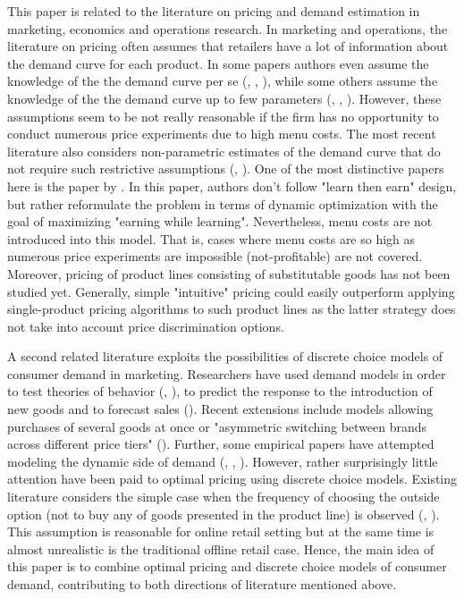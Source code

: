 \documentclass[12pt]{article}
\begin{document}
\par This paper is related to the literature on pricing and demand estimation in marketing, economics and operations research.
In marketing and operations, the literature on pricing often assumes that retailers have a lot of information about the demand curve for each product.
In some papers authors even assume the knowledge of the the demand curve per se (\cite{acquisti2005conditioning}, \cite{nair2007intertemporal}, \cite{akccay2010joint}), while some others assume the knowledge of the the demand curve up to few parameters (\cite{braden1994nonlinear}, \cite{bonatti2011menu}, \cite{biyalogorsky2014design}).
However, these assumptions seem to be not really reasonable if the firm has no opportunity to conduct numerous price experiments due to high menu costs.
The most recent literature also considers non-parametric estimates of the demand curve that do not require such restrictive assumptions (\cite{lei2014near}, \cite{misra2018dynamic}).
One of the most distinctive papers here is the paper by \cite{misra2018dynamic}.
In this paper, authors don't follow "learn then earn" design, but rather reformulate the problem in terms of dynamic optimization with the goal of maximizing "earning while learning".
Nevertheless, menu costs are not introduced into this model.
That is, cases where menu costs are so high as numerous price experiments are impossible (not-profitable) are not covered.
Moreover, pricing of product lines consisting of substitutable goods has not been studied yet.
Generally, simple "intuitive" pricing could easily outperform applying single-product pricing algorithms to such product lines as the latter strategy does not take into account price discrimination options.

\par A second related literature exploits the possibilities of discrete choice models of consumer demand in marketing. 
Researchers have used demand models in order to test theories of behavior (\cite{hendel2006measuring}, \cite{anderson2003effects}), to predict the response to the introduction of new goods and to forecast sales (\cite{chintagunta2011structural}).
Recent extensions include models allowing purchases of several goods at once or "asymmetric switching between brands across different price tiers" (\cite{chintagunta2011structural}).
Further, some empirical papers have attempted modeling the dynamic side of demand (\cite{erdem2005learning}, \cite{seiler2013impact}, \cite{hartmann2010retail}).
However, rather surprisingly little attention have been paid to optimal pricing using discrete choice models.
Existing literature considers the simple case when the frequency of choosing the outside option (not to buy any of goods presented in the product line) is observed (\cite{li2011pricing}, \cite{du2016optimal}).
This assumption is reasonable for online retail setting but at the same time is almost unrealistic is the traditional offline retail case.
Hence, the main idea of this paper is to combine optimal pricing and discrete choice models of consumer demand, contributing to both directions of literature mentioned above.
\end{document}
